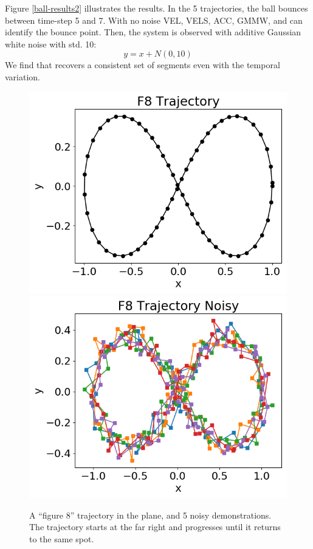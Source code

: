 Figure \ref{ball-results2} illustrates the results.
In the 5 trajectories, the ball bounces between time-step 5 and 7.
With no noise VEL, VELS, ACC, GMMW, and \tsc can identify the bounce point.
Then, the system is observed with additive Gaussian white noise with std. 10:
\[
y = x + N(0,10)
\]
We find that \tsc recovers a consistent set of segments even with the temporal variation.

\begin{figure}%
\centering
\includegraphics[width=0.48\columnwidth]{tsc-experiments/a1.png}
\includegraphics[width=0.48\columnwidth]{tsc-experiments/b1.png}
\caption{A ``figure 8'' trajectory in the plane, and 5 noisy demonstrations. The trajectory starts at the far right and progresses until it returns to the same spot. \label{f8-diagram}}
\end{figure}

